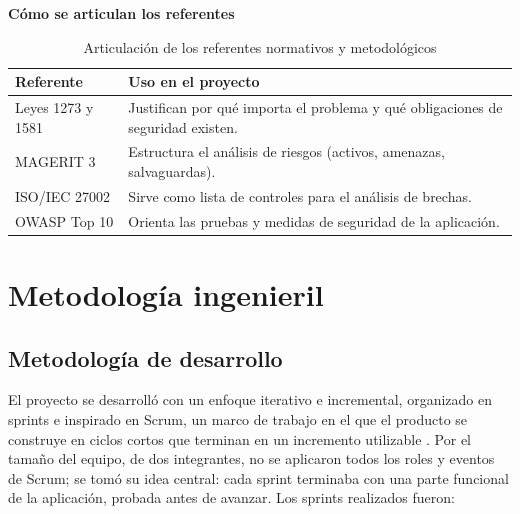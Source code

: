 \documentclass[journal,onecolumn,12pt,draftclsnofoot]{IEEEtran}
\newcommand{\apartado}[1]{\par\medskip\noindent\textbf{#1}\par\smallskip}
\begin{document}
\apartado{Cómo se articulan los referentes}

\begin{table}[htbp]
\centering
\caption{Articulación de los referentes normativos y metodológicos}\label{tab:referentes}
\small
\setlength{\tabcolsep}{4pt}
\begin{tabular}{|p{}|p{}|}
\hline
\textbf{Referente} & \textbf{Uso en el proyecto} \\ \hline
Leyes 1273 y 1581 & Justifican por qué importa el problema y qué obligaciones de seguridad existen. \\ \hline
MAGERIT 3 & Estructura el análisis de riesgos (activos, amenazas, salvaguardas). \\ \hline
ISO/IEC 27002 & Sirve como lista de controles para el análisis de brechas. \\ \hline
OWASP Top 10 & Orienta las pruebas y medidas de seguridad de la aplicación. \\ \hline
\end{tabular}
\end{table}

\section{Metodología ingenieril}

\subsection{Metodología de desarrollo}\label{sec:metodologia}

El proyecto se desarrolló con un enfoque iterativo e incremental, organizado en sprints e inspirado en Scrum, un marco de trabajo en el que el producto se construye en ciclos cortos que terminan en un incremento utilizable \cite{scrum}. Por el tamaño del equipo, de dos integrantes, no se aplicaron todos los roles y eventos de Scrum; se tomó su idea central: cada sprint terminaba con una parte funcional de la aplicación, probada antes de avanzar. Los sprints realizados fueron:
\end{document}
